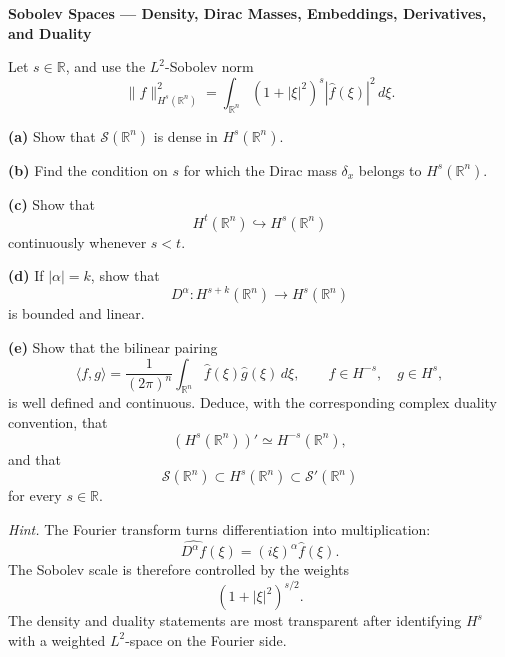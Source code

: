 \begin{problem}[CP-II-0061]
\label{prob:cp-ii-0061}
\textbf{Sobolev Spaces --- Density, Dirac Masses, Embeddings, Derivatives, and Duality}

\hspace*{1.5em}Let \(s\in\mathbb R\), and use the \(L^2\)-Sobolev norm
\[
\|f\|_{H^s(\mathbb R^n)}^2
=
\int_{\mathbb R^n}
(1+|\xi|^2)^s
|\widehat f(\xi)|^2\,d\xi.
\]

\par\smallskip\noindent\textbf{(a)}\quad
Show that \(\mathcal S(\mathbb R^n)\) is dense in
\(H^s(\mathbb R^n)\).

\par\smallskip\noindent\textbf{(b)}\quad
Find the condition on \(s\) for which the Dirac mass
\(\delta_x\) belongs to \(H^s(\mathbb R^n)\).

\par\smallskip\noindent\textbf{(c)}\quad
Show that
\[
H^t(\mathbb R^n)\hookrightarrow H^s(\mathbb R^n)
\]
continuously whenever \(s<t\).

\par\smallskip\noindent\textbf{(d)}\quad
If \(|\alpha|=k\), show that
\[
D^\alpha:
H^{s+k}(\mathbb R^n)
\longrightarrow
H^s(\mathbb R^n)
\]
is bounded and linear.

\par\smallskip\noindent\textbf{(e)}\quad
Show that the bilinear pairing
\[
\langle f,g\rangle
=
\frac1{(2\pi)^n}
\int_{\mathbb R^n}
\widehat f(\xi)\widehat g(\xi)\,d\xi,
\qquad
f\in H^{-s},\quad g\in H^s,
\]
is well defined and continuous. Deduce, with the corresponding complex
duality convention, that
\[
(H^s(\mathbb R^n))'
\simeq
H^{-s}(\mathbb R^n),
\]
and that
\[
\mathcal S(\mathbb R^n)
\subset
H^s(\mathbb R^n)
\subset
\mathcal S'(\mathbb R^n)
\]
for every \(s\in\mathbb R\).

\medskip
\noindent\emph{Hint.} The Fourier transform turns differentiation into multiplication:
\[
\widehat{D^\alpha f}(\xi)
=
(i\xi)^\alpha\widehat f(\xi).
\]
The Sobolev scale is therefore controlled by the weights
\[
(1+|\xi|^2)^{s/2}.
\]
The density and duality statements are most transparent after identifying
\(H^s\) with a weighted \(L^2\)-space on the Fourier side.
\end{problem}

